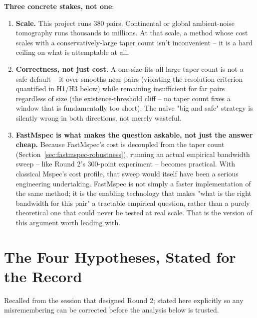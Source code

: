 \documentclass[11pt]{article}
\begin{document}
\textbf{Three concrete stakes, not one}:
\begin{enumerate}[nosep]
  \item \textbf{Scale.} This project runs 380 pairs. Continental or global ambient-noise
    tomography runs thousands to millions. At that scale, a method whose cost scales with a
    conservatively-large taper count isn't inconvenient -- it is a hard ceiling on what is
    attemptable at all.
  \item \textbf{Correctness, not just cost.} A one-size-fits-all large taper count is not a safe
    default -- it over-smooths near pairs (violating the resolution criterion quantified in H1/H3
    below) while remaining insufficient for far pairs regardless of size (the existence-threshold
    cliff -- no taper count fixes a window that is fundamentally too short). The naive "big and
    safe" strategy is silently wrong in both directions, not merely wasteful.
  \item \textbf{FastMspec is what makes the question askable, not just the answer cheap.} Because
    FastMspec's cost is decoupled from the taper count (Section~\ref{sec:fastmspec-robustness}),
    running an actual empirical bandwidth sweep -- like Round 2's 300-point experiment -- becomes
    practical. With classical Mspec's cost profile, that sweep would itself have been a serious
    engineering undertaking. FastMspec is not simply a faster implementation of the same method;
    it is the enabling technology that makes "what is the right bandwidth for this pair" a
    tractable empirical question, rather than a purely theoretical one that could never be tested
    at real scale. That is the version of this argument worth leading with.
\end{enumerate}

\section{The Four Hypotheses, Stated for the Record}
\label{sec:hypotheses}

Recalled from the session that designed Round 2; stated here explicitly so any misremembering
can be corrected before the analysis below is trusted.
\end{document}

